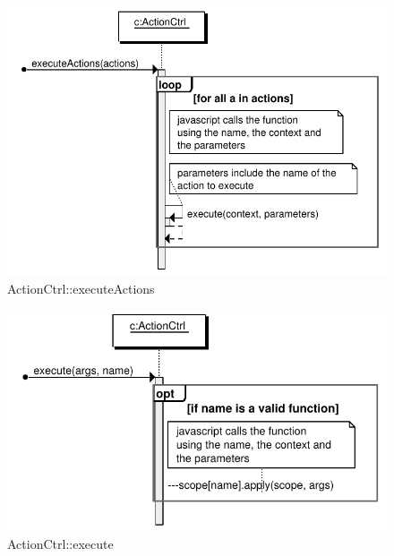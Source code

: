 \begin{figure}[htb]
    \centering
    \includegraphics{figures/design/seqdia/actionCtrl-executeActions.pdf}
    \caption{ActionCtrl::executeActions}
    \label{fig:design-seqdia-actionCtrl-executeActions}
\end{figure}

\begin{figure}[htb]
    \centering
    \includegraphics{figures/design/seqdia/actionCtrl-execute.pdf}
    \caption{ActionCtrl::execute}
    \label{fig:design-seqdia-actionCtrl-execute}
\end{figure}


